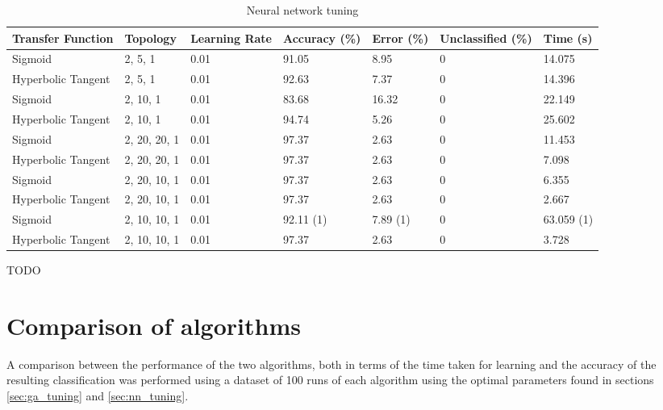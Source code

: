 \documentclass[a4paper]{article}
\begin{document}
\begin{table}[h!]
  \centering
  \begin{tabular}{@{}lllllll@{}}
    \toprule
    Transfer Function  & Topology     & Learning Rate & Accuracy (\%) & Error (\%) & Unclassified (\%) & Time (s)   \\
    \midrule
    Sigmoid            & 2, 5, 1      & 0.01          & 91.05         & 8.95       & 0                 & 14.075     \\
    Hyperbolic Tangent & 2, 5, 1      & 0.01          & 92.63         & 7.37       & 0                 & 14.396     \\
    Sigmoid            & 2, 10, 1     & 0.01          & 83.68         & 16.32      & 0                 & 22.149     \\
    Hyperbolic Tangent & 2, 10, 1     & 0.01          & 94.74         & 5.26       & 0                 & 25.602     \\
    Sigmoid            & 2, 20, 20, 1 & 0.01          & 97.37         & 2.63       & 0                 & 11.453     \\
    Hyperbolic Tangent & 2, 20, 20, 1 & 0.01          & 97.37         & 2.63       & 0                 & 7.098      \\
    Sigmoid            & 2, 20, 10, 1 & 0.01          & 97.37         & 2.63       & 0                 & 6.355      \\
    Hyperbolic Tangent & 2, 20, 10, 1 & 0.01          & 97.37         & 2.63       & 0                 & 2.667      \\
    Sigmoid            & 2, 10, 10, 1 & 0.01          & 92.11 (1)     & 7.89 (1)   & 0                 & 63.059 (1) \\
    Hyperbolic Tangent & 2, 10, 10, 1 & 0.01          & 97.37         & 2.63       & 0                 & 3.728      \\
    \bottomrule
  \end{tabular}
  \caption{Neural network tuning}
  \label{tab:nn_tuning}
\end{table}

TODO

\section{Comparison of algorithms}
\label{sec:comparison}

A comparison between the performance of the two algorithms, both in terms of the
time taken for learning and the accuracy of the resulting classification was
performed using a dataset of 100 runs of each algorithm using the optimal
parameters found in sections \ref{sec:ga_tuning} and \ref{sec:nn_tuning}.
\end{document}
